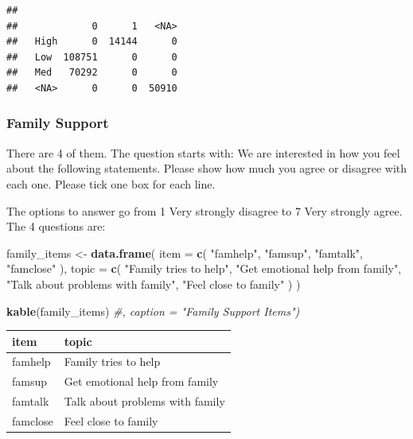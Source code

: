 \documentclass[
]{article}
\newenvironment{Shaded}{\begin{snugshade}}{\end{snugshade}}
\newcommand{\AttributeTok}[1]{\textcolor[rgb]{0.13,0.29,0.53}{#1}}
\newcommand{\CommentTok}[1]{\textcolor[rgb]{0.56,0.35,0.01}{\textit{#1}}}
\newcommand{\FunctionTok}[1]{\textcolor[rgb]{0.13,0.29,0.53}{\textbf{#1}}}
\newcommand{\NormalTok}[1]{#1}
\newcommand{\OtherTok}[1]{\textcolor[rgb]{0.56,0.35,0.01}{#1}}
\newcommand{\SpecialCharTok}[1]{\textcolor[rgb]{0.81,0.36,0.00}{\textbf{#1}}}
\newcommand{\StringTok}[1]{\textcolor[rgb]{0.31,0.60,0.02}{#1}}
\begin{document}
\begin{Shaded}
\end{Shaded}

\begin{verbatim}
##       
##             0      1   <NA>
##   High      0  14144      0
##   Low  108751      0      0
##   Med   70292      0      0
##   <NA>      0      0  50910
\end{verbatim}

\subsubsection{Family Support}\label{family-support}

There are 4 of them. The question starts with: We are interested in how
you feel about the following statements. Please show how much you agree
or disagree with each one. Please tick one box for each line.

The options to answer go from 1 Very strongly disagree to 7 Very
strongly agree. The 4 questions are:

\begin{Shaded}
\begin{Highlighting}[]
\NormalTok{family\_items }\OtherTok{\textless{}{-}} \FunctionTok{data.frame}\NormalTok{(}
  \AttributeTok{item =} \FunctionTok{c}\NormalTok{(}
    \StringTok{"famhelp"}\NormalTok{,}
    \StringTok{"famsup"}\NormalTok{,}
    \StringTok{"famtalk"}\NormalTok{,}
    \StringTok{"famclose"}
\NormalTok{  ),}
  \AttributeTok{topic =} \FunctionTok{c}\NormalTok{(}
    \StringTok{"Family tries to help"}\NormalTok{,}
    \StringTok{"Get emotional help from family"}\NormalTok{,}
    \StringTok{"Talk about problems with family"}\NormalTok{,}
    \StringTok{"Feel close to family"}
\NormalTok{  )}
\NormalTok{)}

\FunctionTok{kable}\NormalTok{(family\_items) }\CommentTok{\#, caption = "Family Support Items")}
\end{Highlighting}
\end{Shaded}

\begin{longtable}[]{@{}ll@{}}
\toprule\noalign{}
item & topic \\
\midrule\noalign{}
\endhead
\bottomrule\noalign{}
\endlastfoot
famhelp & Family tries to help \\
famsup & Get emotional help from family \\
famtalk & Talk about problems with family \\
famclose & Feel close to family \\
\end{longtable}
\end{document}
